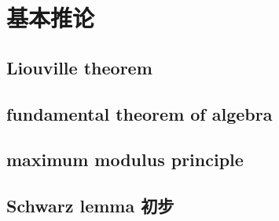 \section{基本推论}
\label{b3:sec:0204}


\subsection{Liouville theorem}
\label{b3:subsec:020401}

\subsection{fundamental theorem of algebra}
\label{b3:subsec:020402}

\subsection{maximum modulus principle}
\label{b3:subsec:020403}

\subsection{Schwarz lemma 初步}
\label{b3:subsec:020404}


